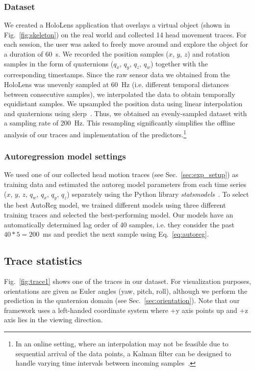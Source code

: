 \documentclass[sigconf]{acmart}			%
\begin{document}
\subsubsection*{Dataset}
We created a HoloLens application that overlays a virtual object (shown in Fig.~\ref{fig:skeleton}) on the real world and collected 14 head movement traces. 
For each session, the user was asked to freely move around and explore the object for a duration of \SI{60}{s}.
We recorded the position samples ($x$, $y$, $z$) and rotation samples in the form of quaternions ($q_x$, $q_y$, $q_z$, $q_w$) together with the corresponding timestamps. 
Since the raw sensor data we obtained from the HoloLens was unevenly sampled at \SI{60}{Hz} (i.e. different temporal distances between consecutive samples), we interpolated the data to obtain temporally equidistant samples. 
We upsampled the position data using linear interpolation and quaternions using \gls{slerp}~\cite{shoemake1985}. 
Thus, we obtained an evenly-sampled dataset with a sampling rate of \SI{200}{Hz}.
This resampling significantly simplifies the offline analysis of our traces and implementation of the predictors.\footnote{In an online setting, where an interpolation may not be feasible due to sequential arrival of the data points, a Kalman filter can be designed to handle varying time intervals between incoming samples~\cite{labbe2015}.}

\subsubsection*{Autoregression model settings}
We used one of our collected head motion traces (see Sec.~\ref{sec:exp_setup}) as training data and estimated the \gls{autoreg} model parameters from each time series ($x$, $y$, $z$, $q_w$, $q_x$, $q_y$, $q_z$) separately using the Python library \emph{statsmodels}~\cite{statsmodels}.
To select the best AutoReg model, we trained different models using three different training traces and selected the best-performing model.
Our models have an automatically determined lag order of 40 samples, i.e. they consider the past $40*5=200$~ms and predict the next sample using Eq.~\eqref{eq:autoreg}.

\subsection{Trace statistics}
\label{sec:trace_stats}

Fig.~\ref{fig:trace1} shows one of the traces in our dataset.
For visualization purposes, orientations are given as Euler angles (yaw, pitch, roll), although we perform the prediction in the quaternion domain (see Sec.~\ref{sec:orientation}).
Note that our framework uses a left-handed coordinate system where +y axis points up and +z axis lies in the viewing direction.
\end{document}
